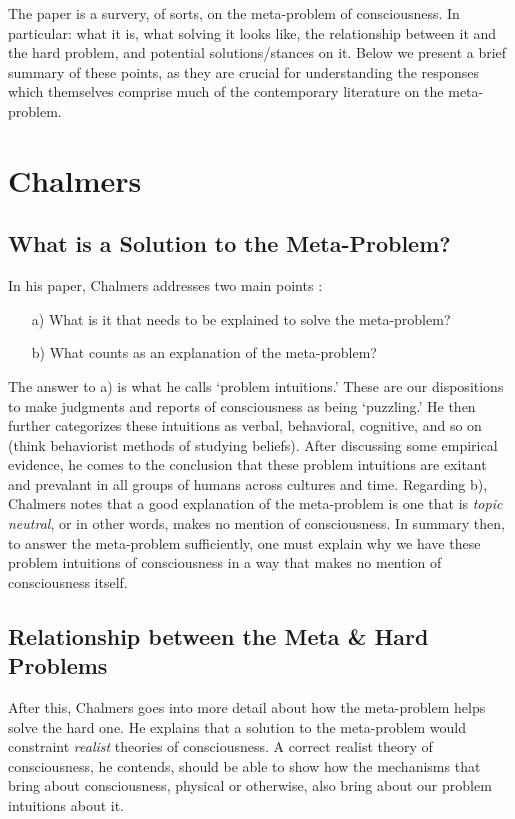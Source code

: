 \documentclass[11pt]{article}
\begin{document}
The paper is a survery, of sorts, on the meta-problem of consciousness. In particular: what it is, what solving it looks like, the relationship between it and the hard problem, and potential solutions/stances on it. Below we present a brief summary of these points, as they are crucial for understanding the responses which themselves comprise much of the contemporary literature on the meta-problem.

\section*{Chalmers}
\subsection*{What is a Solution to the Meta-Problem?}
In his paper, Chalmers addresses two main points \cite{Kammerer2019-KAMEID-2}:
\begin{enumerate}
    \item[a)] What is it that needs to be explained to solve the meta-problem?
    \item[b)] What counts as an explanation of the meta-problem?
\end{enumerate}

The answer to a) is what he calls `problem intuitions.' These are our dispositions to make judgments and reports of consciousness as being `puzzling.' He then further categorizes these intuitions as verbal, behavioral, cognitive, and so on (think behaviorist methods of studying beliefs). After discussing some empirical evidence, he comes to the conclusion that these problem intuitions are exitant and prevalant in all groups of humans across cultures and time. Regarding b), Chalmers notes that a good explanation of the meta-problem is one that is \textit{topic neutral}, or in other words, makes no mention of consciousness. In summary then, to answer the meta-problem sufficiently, one must explain why we have these problem intuitions of consciousness in a way that makes no mention of consciousness itself.

\subsection*{Relationship between the Meta \& Hard Problems}
After this, Chalmers goes into more detail about how the meta-problem helps solve the hard one. He explains that a solution to the meta-problem would constraint \textit{realist} theories of consciousness. A correct realist theory of consciousness, he contends, should be able to show how the mechanisms that bring about consciousness, physical or otherwise, also bring about our problem intuitions about it.
\end{document}
